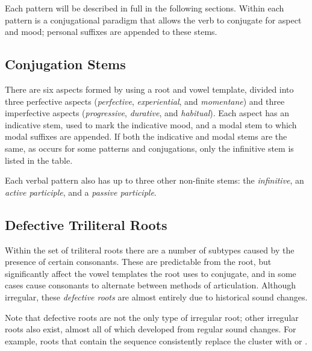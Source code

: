 \documentclass[grammar]{subfiles}
\begin{document}
%        

%        


Each pattern will be described in full in the following sections.  Within each
pattern is a conjugational paradigm that allows the verb to conjugate for
aspect and mood; personal suffixes are appended to these stems.


\subsection{Conjugation Stems}
\label{sssec:vm:conjugation}

There are six aspects formed by using a root and vowel template, divided into
three perfective aspects (\emph{perfective}, \emph{experiential}, and
\emph{momentane}) and three imperfective aspects (\emph{progressive},
\emph{durative}, and \emph{habitual}).  Each aspect has an indicative stem,
used to mark the indicative mood, and a modal stem to which modal suffixes are
appended.  If both the indicative and modal stems are the same, as occurs for
some patterns and conjugations, only the infinitive stem is listed in the
table. 

Each verbal pattern also has up to three other non-finite stems: the
\emph{infinitive}, an \emph{active participle}, and a \emph{passive participle}.  


\subsection{Defective Triliteral Roots}
\label{ssec:vm:defective_roots}

Within the set of triliteral roots there are a number of subtypes caused by
the presence of certain consonants.  These are predictable from the root, but
significantly affect the vowel templates the root uses to conjugate, and in
some cases cause consonants to alternate between methods of articulation.
Although irregular, these \emph{defective roots} are almost entirely due to
historical sound changes. 

Note that defective roots are not the only type of irregular root; other
irregular roots also exist, almost all of which developed from regular sound
changes.  For example, roots that contain the sequence  consistently
replace the cluster  with  or .
\end{document}
